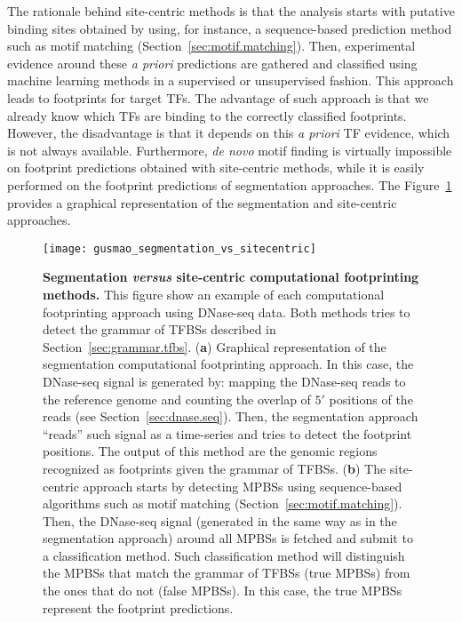 The rationale behind site-centric methods is that the analysis starts with putative binding sites obtained by using, for instance, a sequence-based prediction method such as motif matching (Section~\ref{sec:motif.matching}). Then, experimental evidence around these \emph{a priori} predictions are gathered and classified using machine learning methods in a supervised or unsupervised fashion. This approach leads to footprints for target TFs. The advantage of such approach is that we already know which TFs are binding to the correctly classified footprints. However, the disadvantage is that it depends on this \emph{a priori} TF evidence, which is not always available. Furthermore, \emph{de novo} motif finding is virtually impossible on footprint predictions obtained with site-centric methods, while it is easily performed on the footprint predictions of segmentation approaches. The Figure~\ref{fig:gusmao_segmentation_vs_sitecentric} provides a graphical representation of the segmentation and site-centric approaches.

\begin{figure}[h!]
\centering
\texttt{[image: gusmao\_segmentation\_vs\_sitecentric]}
\caption[Segmentation \emph{versus} site-centric computational footprinting methods]{\textbf{Segmentation \emph{versus} site-centric computational footprinting methods.} This figure show an example of each computational footprinting approach using DNase-seq data. Both methods tries to detect the grammar of TFBSs described in Section~\ref{sec:grammar.tfbs}. (\textbf{a}) Graphical representation of the segmentation computational footprinting approach. In this case, the DNase-seq signal is generated by: mapping the DNase-seq reads to the reference genome and counting the overlap of $5\prime$ positions of the reads (see Section~\ref{sec:dnase.seq}). Then, the segmentation approach ``reads'' such signal as a time-series and tries to detect the footprint positions. The output of this method are the genomic regions recognized as footprints given the grammar of TFBSs. (\textbf{b}) The site-centric approach starts by detecting MPBSs using sequence-based algorithms such as motif matching (Section~\ref{sec:motif.matching}). Then, the DNase-seq signal (generated in the same way as in the segmentation approach) around all MPBSs is fetched and submit to a classification method. Such classification method will distinguish the MPBSs that match the grammar of TFBSs (true MPBSs) from the ones that do not (false MPBSs). In this case, the true MPBSs represent the footprint predictions.}
\label{fig:gusmao_segmentation_vs_sitecentric}
\end{figure}

